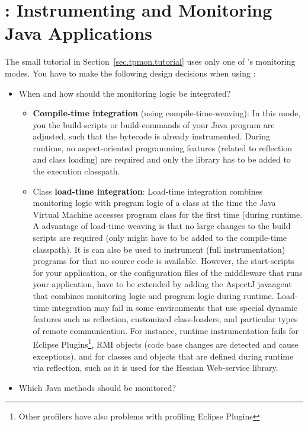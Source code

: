 \documentclass[a4paper,12pt]{scrartcl}
\begin{document}

\section{\tpmon{}: Instrumenting and Monitoring Java Applications}\label{sec.tpmon}

The small tutorial in Section~\ref{sec.tpmon.tutorial} uses only one of \tpmon{}'s monitoring modes. You have to make the following design decisions when using \tpmon{}:
\begin{itemize}
 \item When and how should the monitoring logic be integrated?
\begin{itemize}
 \item \textbf{Compile-time integration} (using compile-time-weaving): In this mode, you the build-scripts or build-commands of your Java program are adjusted, such that the bytecode is already instrumented. During runtime, no aspect-oriented programming features (related to reflection and class loading) are required and only the \tpmon{} library has to be added to the execution classpath.
\item Class \textbf{load-time integration}: Load-time integration combines monitoring logic with program logic of a class at the time the Java Virtual Machine accesses program class for the first time (during runtime. A advantage of load-time weaving is that no large changes to the build scripts are required (only \tpmon{} might have to be added to the compile-time classpath). It is can also be used to instrument (full instrumentation) programs for that no source code is available. However, the start-scripts for your application, or the configuration files of the middleware that runs your application, have to be extended by adding the AspectJ javaagent that combines monitoring logic and program logic during runtime. Load-time integration may fail in some environments that use special dynamic features such as reflection, customized class-loaders, and particular types of remote communication. For instance, runtime instrumentation fails for Eclipse Plugins\footnote{Other profilers have also problems with profiling Eclipse Plugins}, RMI objects (code base changes are detected and cause exceptions), and for classes and objects that are defined during runtime via reflection, such as it is used for the Hessian Web-service library.
\end{itemize}
\item Which Java methods should be monitored?
\begin{itemize}

\end{itemize}
\end{itemize}
\end{document}
